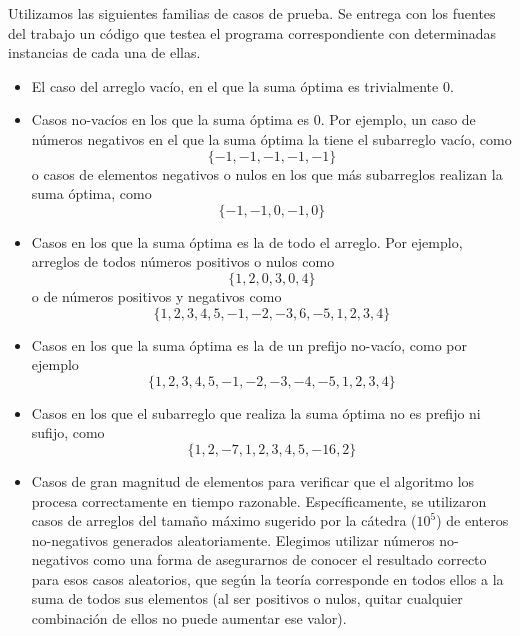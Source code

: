 Utilizamos las siguientes familias de casos de prueba. Se entrega con los fuentes del trabajo un código que testea el programa correspondiente con determinadas instancias de cada una de ellas.

\begin{itemize}
    \item El caso del arreglo vacío, en el que la suma óptima es trivialmente $0$.
    \item Casos no-vacíos en los que la suma óptima es $0$. Por ejemplo, un caso de números negativos en el que la suma óptima la tiene el subarreglo vacío, como
    \[
        \{-1,-1,-1,-1,-1\}
    \]
    o casos de elementos negativos o nulos en los que más subarreglos realizan la suma óptima, como
    \[
        \{-1,-1,0,-1,0\}
    \]
    \item Casos en los que la suma óptima es la de todo el arreglo. Por ejemplo, arreglos de todos números positivos o nulos como
    \[
        \{1,2,0,3,0,4\}
    \]
    o de números positivos y negativos como
    \[
        \{1,2,3,4,5,-1,-2,-3,6,-5,1,2,3,4\}
    \]
    \item Casos en los que la suma óptima es la de un prefijo no-vacío, como por ejemplo
    \[
        \{1,2,3,4,5,-1,-2,-3,-4,-5,1,2,3,4\}
    \]
    \item Casos en los que el subarreglo que realiza la suma óptima no es prefijo ni sufijo, como
    \[
        \{1,2,-7,1,2,3,4,5,-16,2\}
    \]
    \item Casos de gran magnitud de elementos para verificar que el algoritmo los procesa correctamente en tiempo razonable. Específicamente, se utilizaron casos de arreglos del tamaño máximo sugerido por la cátedra ($10^5$) de enteros no-negativos generados aleatoriamente. Elegimos utilizar números no-negativos como una forma de asegurarnos de conocer el resultado correcto para esos casos aleatorios, que según la teoría corresponde en todos ellos a la suma de todos sus elementos (al ser positivos o nulos, quitar cualquier combinación de ellos no puede aumentar ese valor).

\end{itemize}
